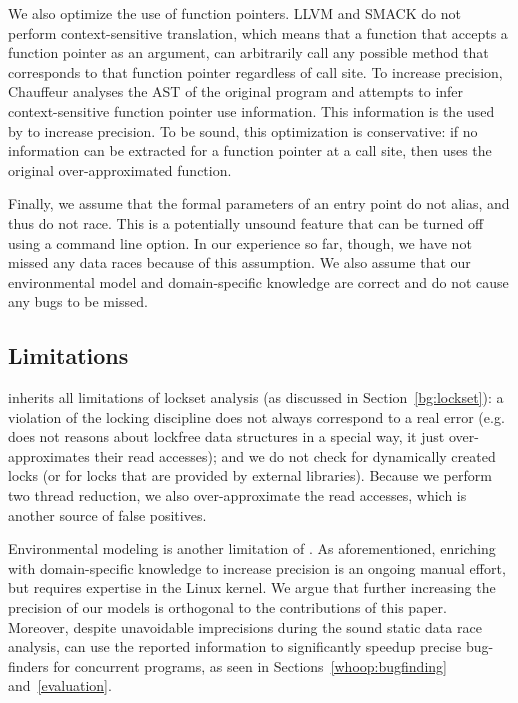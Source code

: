 We also optimize the use of function pointers. LLVM and SMACK do not perform context-sensitive translation, which means that a function that accepts a function pointer as an argument, can arbitrarily call any possible method that corresponds to that function pointer regardless of call site. To increase precision, Chauffeur analyses the AST of the original program and attempts to infer context-sensitive function pointer use information. This information is the used by \whoop to increase precision. To be sound, this optimization is conservative: if no information can be extracted for a function pointer at a call site, then \whoop uses the original over-approximated function.

Finally, we assume that the formal parameters of an entry point do not alias, and thus do not race. This is a potentially unsound feature that can be turned off using a command line option. In our experience so far, though, we have not missed any data races because of this assumption. We also assume that our environmental model and domain-specific knowledge are correct and do not cause any bugs to be missed.

\subsection{Limitations}
\label{whoop:limitations}

\whoop inherits all limitations of lockset analysis (as discussed in Section~\ref{bg:lockset}): a violation of the locking discipline does not always correspond to a real error (e.g. \whoop does not reasons about lockfree data structures in a special way, it just over-approximates their read accesses); and we do not check for dynamically created locks (or for locks that are provided by external libraries). Because we perform two thread reduction, we also over-approximate the read accesses, which is another source of false positives.

Environmental modeling is another limitation of \whoop. As aforementioned, enriching \whoop with domain-specific knowledge to increase precision is an ongoing manual effort, but requires expertise in the Linux kernel. We argue that further increasing the precision of our models is orthogonal to the contributions of this paper. Moreover, despite unavoidable imprecisions during the sound static data race analysis, \whoop can use the reported information to significantly speedup precise bug-finders for concurrent programs, as seen in Sections~\ref{whoop:bugfinding} and~\ref{evaluation}.

